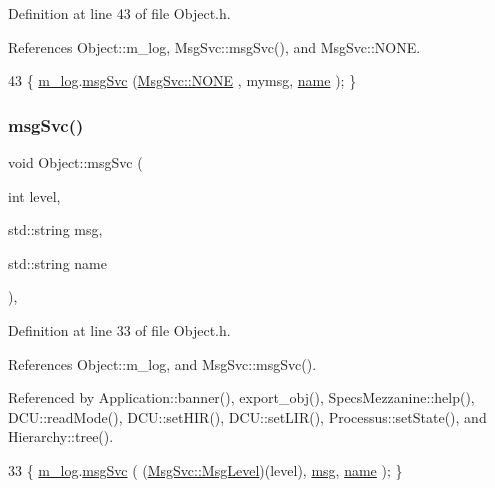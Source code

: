 Definition at line 43 of file Object.\+h.



References Object\+::m\+\_\+log, Msg\+Svc\+::msg\+Svc(), and Msg\+Svc\+::\+N\+O\+NE.


\begin{DoxyCode}
43 \{ \hyperlink{classObject_a0d269813dd7ac1f24bc143031e2963f2}{m\_log}.\hyperlink{classMsgSvc_ad25f18047920cc59a314e5098259711c}{msgSvc} (\hyperlink{classMsgSvc_ae671eb7301996cd049d2da8a65925926a9be9ae32fed8e1e6eba4a58692210fbd}{MsgSvc::NONE}    , mymsg, \hyperlink{classObject_a300f4c05dd468c7bb8b3c968868443c1}{name} ); \}
\end{DoxyCode}
\mbox{\label{classObject_a3f9d5537ebce0c0f2bf6ae4d92426f3c}} 
\subsubsection{\texorpdfstring{msg\+Svc()}{msgSvc()}}
{\footnotesize\ttfamily void Object\+::msg\+Svc (\begin{DoxyParamCaption}\item[{int}]{level,  }\item[{std\+::string}]{msg,  }\item[{std\+::string}]{name }\end{DoxyParamCaption})\hspace{0.3cm}{\ttfamily [inline]}, {\ttfamily [inherited]}}



Definition at line 33 of file Object.\+h.



References Object\+::m\+\_\+log, and Msg\+Svc\+::msg\+Svc().



Referenced by Application\+::banner(), export\+\_\+obj(), Specs\+Mezzanine\+::help(), D\+C\+U\+::read\+Mode(), D\+C\+U\+::set\+H\+I\+R(), D\+C\+U\+::set\+L\+I\+R(), Processus\+::set\+State(), and Hierarchy\+::tree().


\begin{DoxyCode}
33 \{ \hyperlink{classObject_a0d269813dd7ac1f24bc143031e2963f2}{m\_log}.\hyperlink{classMsgSvc_ad25f18047920cc59a314e5098259711c}{msgSvc} ( (\hyperlink{classMsgSvc_ae671eb7301996cd049d2da8a65925926}{MsgSvc::MsgLevel})(level), \hyperlink{classObject_a58b2d0618c2d08cf2383012611528d97}{msg}, 
      \hyperlink{classObject_a300f4c05dd468c7bb8b3c968868443c1}{name} ); \}
\end{DoxyCode}
\mbox{\label{classObject_a300f4c05dd468c7bb8b3c968868443c1}} 

